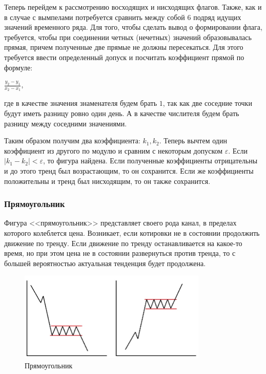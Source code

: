 \documentclass[bachelor, och, coursework]{SCWorks}
\begin{document}
    Теперь перейдем к рассмотрению восходящих и нисходящих флагов. Также, как и
    в случае с вымпелами потребуется сравнить между собой 6 подряд идущих
    значений временного ряда. Для того, чтобы сделать вывод о формировании
    флага, требуется, чтобы при соединении четных (нечетных) значений
    образовывалась прямая, причем полученные две прямые не должны пересекаться.
    Для этого требуется ввести определенный допуск и посчитать коэффициент
    прямой по формуле:
    \begin{center}
        $\frac{y_2 - y_1}{x_2 - x_1}$,
    \end{center}
    где в качестве значения знаменателя будем брать $1$, так как две соседние
    точки будут иметь разницу ровно один день. А в качестве числителя будем
    брать разницу между соседними значениями.
    
    Таким образом получим два коэффициента: $k_1, k_2$. Теперь вычтем один
    коэффициент из другого по модулю и сравним с некоторым допуском
    $\varepsilon$. Если $|k_1 - k_2| < \varepsilon$, то фигура найдена. Если
    полученные коэффициенты отрицательны и до этого тренд был возрастающим, то
    он сохранится. Если же коэффициенты положительны и тренд был нисходящим, то
    он также сохранится.

    \subsubsection{Прямоугольник}

    Фигура <<прямоугольник>> представляет своего рода канал, в пределах которого
    колеблется цена. Возникает, если котировки не в состоянии продолжить
    движение по тренду. Если движение по тренду останавливается на какое-то
    время, но при этом цена не в состоянии развернуться против тренда, то с
    большей вероятностью актуальная тенденция будет продолжена.

    \begin{figure}[H]
        \centering
        \includegraphics[width=0.8\textwidth]{pic/rectangles.jpg}
        \caption{Прямоугольник}
    \end{figure}
\end{document}
